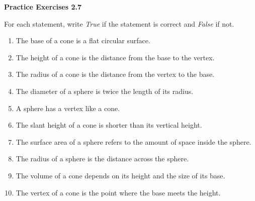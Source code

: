 
\vspace{0.75ex}
\noindent\textbf{Practice Exercises 2.7}

For each statement, write \emph{True} if the statement is correct and \emph{False} if not.
\begin{enumerate}[noitemsep, label = \color{blue}\arabic*. ]
    \item The base of a cone is a flat circular surface. 
    \item The height of a cone is the distance from the base to the vertex. 
    \item The radius of a cone is the distance from the vertex to the base. 
    \item The diameter of a sphere is twice the length of its radius. 
    \item A sphere has a vertex like a cone. 
    \item The slant height of a cone is shorter than its vertical height. 
    \item The surface area of a sphere refers to the amount of space inside the sphere. 
    \item The radius of a sphere is the distance across the sphere. 
    \item The volume of a cone depends on its height and the size of its base. 
    \item The vertex of a cone is the point where the base meets the height. 
\end{enumerate}

